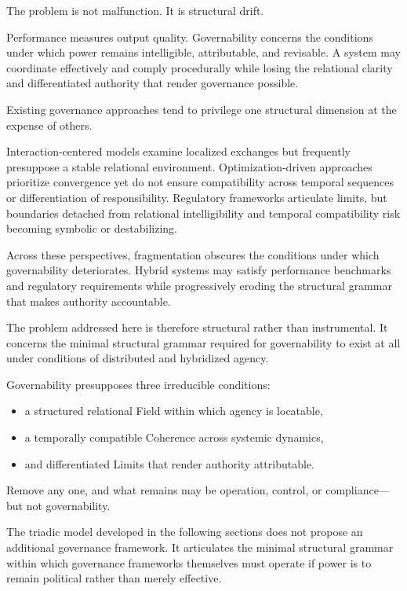 \documentclass[12pt]{article}
\begin{document}
The problem is not malfunction. It is structural drift.

Performance measures output quality. Governability concerns the conditions under which power remains intelligible, attributable, and revisable. A system may coordinate effectively and comply procedurally while losing the relational clarity and differentiated authority that render governance possible.

Existing governance approaches tend to privilege one structural dimension at the expense of others.

Interaction-centered models examine localized exchanges but frequently presuppose a stable relational environment. Optimization-driven approaches prioritize convergence yet do not ensure compatibility across temporal sequences or differentiation of responsibility. Regulatory frameworks articulate limits, but boundaries detached from relational intelligibility and temporal compatibility risk becoming symbolic or destabilizing.

Across these perspectives, fragmentation obscures the conditions under which governability deteriorates. Hybrid systems may satisfy performance benchmarks and regulatory requirements while progressively eroding the structural grammar that makes authority accountable.

The problem addressed here is therefore structural rather than instrumental. It concerns the minimal structural grammar required for governability to exist at all under conditions of distributed and hybridized agency.

Governability presupposes three irreducible conditions:

\begin{itemize}
\item a structured relational Field within which agency is locatable,
\item a temporally compatible Coherence across systemic dynamics,
\item and differentiated Limits that render authority attributable.
\end{itemize}

Remove any one, and what remains may be operation, control, or compliance—but not governability.

The triadic model developed in the following sections does not propose an additional governance framework. It articulates the minimal structural grammar within which governance frameworks themselves must operate if power is to remain political rather than merely effective.
\end{document}
